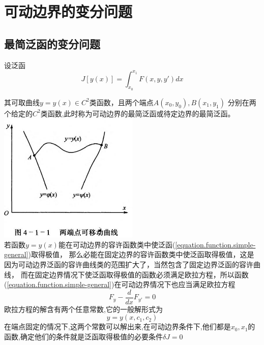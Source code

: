\section{可动边界的变分问题}
\subsection{最简泛函的变分问题}
设泛函
\begin{equation}
  J[y(x)]=\int_{x_0}^{x_1}F(x,y,y')dx
\label{equation.function.simple-general}
\end{equation}

其可取曲线$y = y(x) \in C^2$类函数，且两个端点$A(x_0,y_0),B(x_1,y_1)$ 分别在两个给定的$C^2$类函数,此时称为可动边界的最简泛函或待定边界的最简泛函。\\

\includegraphics[width=0.5\textwidth]{image/limit-move}\\

若函数$y=y(x)$能在可动边界的容许函数类中使泛函(\ref{equation.function.simple-general})取得极值，
那么必能在固定边界的容许函数类中使泛函取得极值，这是因为可动边界泛函的容许曲线类的范围扩大了，当然包含了固定边界泛函的容许曲线，
而在固定边界情况下使泛函取得极值的函数必须满足欧拉方程，所以函数(\ref{equation.function.simple-general})在可动边界情况下也应当满足欧拉方程
$$
F_y - \frac{d}{dx}F_{y'} =0
$$
欧拉方程的解含有两个任意常数,它的一般解形式为
$$y=y(x,c_1,c_2)$$
在端点固定的情况下,这两个常数可以解出来,在可动边界条件下,他们都是$x_0,x_1$的函数,确定他们的条件就是泛函取得极值的必要条件$\delta J=0$

